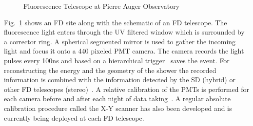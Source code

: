\begin{figure}
  \centering
  \hfill
  \caption{Fluorescence Telescope at Pierre Auger Observatory}
  \label{fig:FD_sketch_schematic}
\end{figure}

Fig.~\ref{fig:FD_sketch_schematic} shows an FD site along with the schematic of an FD telescope. The fluorescence light enters through the UV filtered window 
which is surrounded by a corrector ring. A spherical segmented mirror is used to gather the incoming light and focus it onto a 440 pixeled PMT camera. The camera records the light pulses every 100ns and based on a hierarchical trigger~\cite{Abraham_2010_FD} saves the event. For reconstructing the energy and the geometry of the shower the recorded information is combined with the information detected by the SD (hybrid) or other FD telescopes (stereo)~\cite{SALAMIDA2008207}. A relative calibration of the PMTs is performed for each camera before and after each night of data taking~\cite{Abraham_2010_FD}. A regular absolute calibration procedure called the X-Y scanner has also been developed and is currently being deployed at each FD telescope. 

